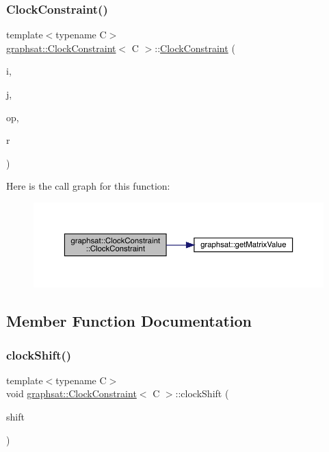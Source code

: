 \subsubsection{\texorpdfstring{ClockConstraint()}{ClockConstraint()}\hspace{0.1cm}{\footnotesize\ttfamily [2/2]}}
{\footnotesize\ttfamily template$<$typename C$>$ \\
\mbox{\hyperlink{classgraphsat_1_1_clock_constraint}{graphsat\+::\+Clock\+Constraint}}$<$ C $>$\+::\mbox{\hyperlink{classgraphsat_1_1_clock_constraint}{Clock\+Constraint}} (\begin{DoxyParamCaption}\item[{const int}]{i,  }\item[{const int}]{j,  }\item[{\mbox{\hyperlink{namespacegraphsat_acfb5939f9bdafbd9aea0d084b9a56f69}{C\+O\+M\+P\+\_\+\+O\+P\+E\+R\+A\+T\+OR}}}]{op,  }\item[{const C}]{r }\end{DoxyParamCaption})\hspace{0.3cm}{\ttfamily [inline]}}

Here is the call graph for this function\+:\nopagebreak
\begin{figure}[H]
\begin{center}
\leavevmode
\includegraphics[width=350pt]{classgraphsat_1_1_clock_constraint_a81ba549abd62032b7491ff03190d31e0_cgraph}
\end{center}
\end{figure}


\subsection{Member Function Documentation}
\mbox{\label{classgraphsat_1_1_clock_constraint_a609e8b8b9805a2934da918fbf8311ddc}} 
\subsubsection{\texorpdfstring{clockShift()}{clockShift()}}
{\footnotesize\ttfamily template$<$typename C$>$ \\
void \mbox{\hyperlink{classgraphsat_1_1_clock_constraint}{graphsat\+::\+Clock\+Constraint}}$<$ C $>$\+::clock\+Shift (\begin{DoxyParamCaption}\item[{int}]{shift }\end{DoxyParamCaption})\hspace{0.3cm}{\ttfamily [inline]}}


